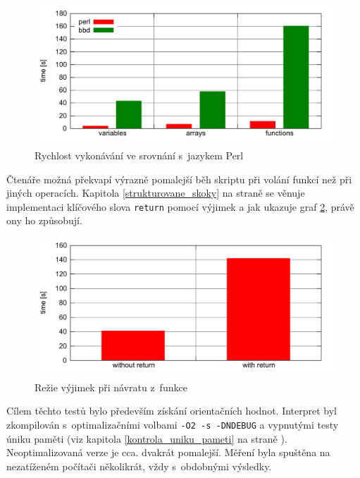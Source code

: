 \documentclass[11pt,twoside,a4paper]{book}
\begin{document}
\begin{figure}[ht]
\begin{center}
\includegraphics[width=11.5cm]{img/benchmark.pdf}
\caption{Rychlost vykonávání ve srovnání s~jazykem Perl}
\label{fig:benchmark}
\end{center}
\end{figure}

Čtenáře možná překvapí výrazně pomalejší běh skriptu při volání funkcí než při jiných operacích. Kapitola \ref{strukturovane_skoky} na straně \pageref{strukturovane_skoky} se věnuje implementaci klíčového slova \texttt{return} pomocí výjimek a jak ukazuje graf \ref{fig:benchmark_func}, právě ony ho způsobují.

\begin{figure}[hb]
\begin{center}
\includegraphics[width=11.5cm]{img/benchmark_func.pdf}
\caption{Režie výjimek při návratu z~funkce}
\label{fig:benchmark_func}
\end{center}
\end{figure}

Cílem těchto testů bylo především získání orientačních hodnot. Interpret byl zkompilován s~optimalizačními volbami \texttt{-O2 -s -DNDEBUG} a vypnutými testy úniku paměti (viz kapitola \ref{kontrola_uniku_pameti} na straně \pageref{kontrola_uniku_pameti}). Neoptimalizovaná verze je cca. dvakrát pomalejší. Měření byla spuštěna na nezatíženém počítači několikrát, vždy s~obdobnými výsledky.
\end{document}
